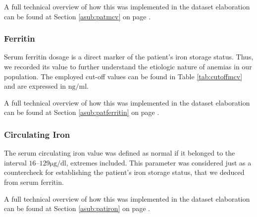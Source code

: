 
A full technical overview of how this was implemented in the dataset elaboration can be found at Section \ref{asub:patmcv} on page \pageref{asub:patmcv}.

\subsubsection{Ferritin}\label{sub:ferritin}
Serum ferritin dosage is a direct marker of the patient's iron storage status. Thus, we recorded its value to further understand the etiologic nature of anemias in our population. The employed cut-off values can be found in Table \ref{tab:cutoffmcv} and are expressed in $\si{\nano\gram/\milli\litre}$.

A full technical overview of how this was implemented in the dataset elaboration can be found at Section \ref{asub:patferritin} on page \pageref{asub:patferritin}.

\subsubsection{Circulating Iron}\label{sub:iron}
The serum circulating iron value was defined as normal if it belonged to the interval $16–129 \si{\micro\gram/\deci\litre}$, extremes included. This parameter was considered just as a countercheck for establishing the patient's iron storage status, that we deduced from serum ferritin.

A full technical overview of how this was implemented in the dataset elaboration can be found at Section \ref{asub:patiron} on page \pageref{asub:patiron}.

